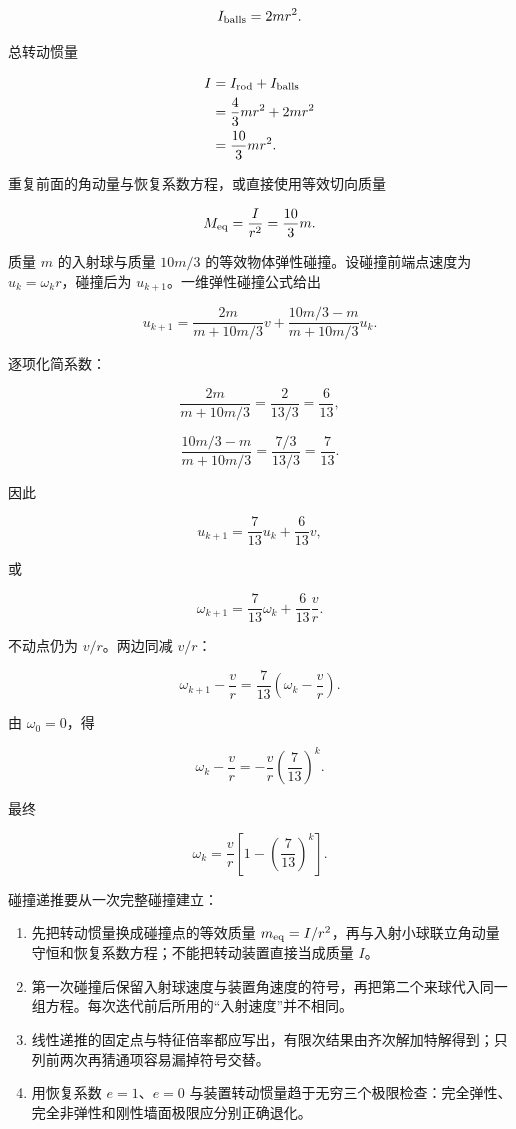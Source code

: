 \documentclass[12pt,a4paper,UTF8]{ctexart}
\newcommand{\tightlist}{\setlength{\itemsep}{0pt}\setlength{\parskip}{0pt}}
\begin{document}
\[I_{\rm balls}=2mr^2.\]

总转动惯量

\[
\begin{aligned}
I
&=I_{\rm rod}+I_{\rm balls}\\
&=\frac43mr^2+2mr^2\\
&=\frac{10}{3}mr^2.
\end{aligned}
\]

重复前面的角动量与恢复系数方程，或直接使用等效切向质量

\[
M_{\rm eq}=\frac{I}{r^2}=\frac{10}{3}m.
\]

质量 \(m\) 的入射球与质量 \(10m/3\)
的等效物体弹性碰撞。设碰撞前端点速度为 \(u_k=\omega_k r\)，碰撞后为
\(u_{k+1}\)。一维弹性碰撞公式给出

\[
u_{k+1}
=\frac{2m}{m+10m/3}v
+\frac{10m/3-m}{m+10m/3}u_k.
\]

逐项化简系数：

\[
\frac{2m}{m+10m/3}
=\frac{2}{13/3}
=\frac6{13},
\]

\[
\frac{10m/3-m}{m+10m/3}
=\frac{7/3}{13/3}
=\frac7{13}.
\]

因此

\[
u_{k+1}=\frac7{13}u_k+\frac6{13}v,
\]

或

\[
\boxed{\omega_{k+1}=\frac7{13}\omega_k+\frac6{13}\frac vr}. \tag{6}
\]

不动点仍为 \(v/r\)。两边同减 \(v/r\)：

\[
\omega_{k+1}-\frac vr
=\frac7{13}\left(\omega_k-\frac vr\right).
\]

由 \(\omega_0=0\)，得

\[
\omega_k-\frac vr
=-\frac vr\left(\frac7{13}\right)^k.
\]

最终

\[
\boxed{\omega_k=\frac vr\left[1-\left(\frac7{13}\right)^k\right]}.
\]

碰撞递推要从一次完整碰撞建立：

\begin{enumerate}
\def\labelenumi{\arabic{enumi}.}
\tightlist
\item
  先把转动惯量换成碰撞点的等效质量
  \(m_{\rm eq}=I/r^2\)，再与入射小球联立角动量守恒和恢复系数方程；不能把转动装置直接当成质量
  \(I\)。
\item
  第一次碰撞后保留入射球速度与装置角速度的符号，再把第二个来球代入同一组方程。每次迭代前后所用的``入射速度''并不相同。
\item
  线性递推的固定点与特征倍率都应写出，有限次结果由齐次解加特解得到；只列前两次再猜通项容易漏掉符号交替。
\item
  用恢复系数 \(e=1\)、\(e=0\)
  与装置转动惯量趋于无穷三个极限检查：完全弹性、完全非弹性和刚性墙面极限应分别正确退化。
\end{enumerate}
\end{document}
